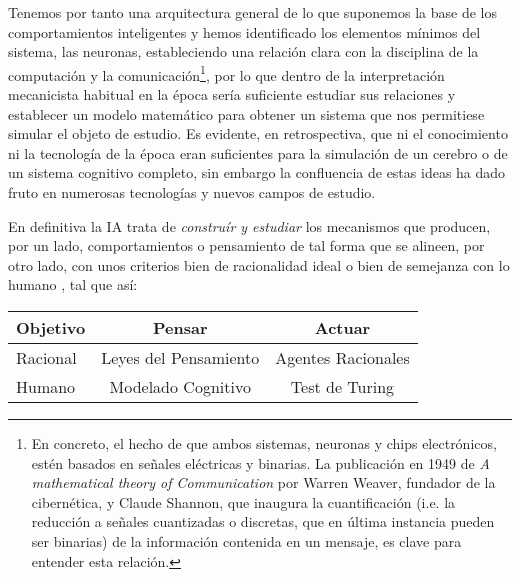 \documentclass[12pt]{memoir}
\begin{document}
Tenemos por tanto una arquitectura general de lo que suponemos la base de los comportamientos inteligentes y hemos identificado los elementos mínimos del sistema, las neuronas, estableciendo una relación clara con la disciplina de la computación y la comunicación\footnote{En concreto, el hecho de que ambos sistemas, neuronas y chips electrónicos, estén basados en señales eléctricas y binarias. La publicación en 1949 de \textit{A mathematical theory of Communication} por Warren Weaver, fundador de la cibernética, y Claude Shannon, que inaugura la cuantificación (i.e. la reducción a señales cuantizadas o discretas, que en última instancia pueden ser binarias) de la información contenida en un mensaje, es clave para entender esta relación.}, por lo que dentro de la interpretación mecanicista habitual en la época sería suficiente estudiar sus relaciones y establecer un modelo matemático para obtener un sistema que nos permitiese simular el objeto de estudio. Es evidente, en retrospectiva, que ni el conocimiento ni la tecnología de la época eran suficientes para la simulación de un cerebro o de un sistema cognitivo completo, sin embargo la confluencia de estas ideas ha dado fruto en numerosas tecnologías y nuevos campos de estudio.

En definitiva la IA trata de \textit{construír y estudiar} los mecanismos que producen, por un lado, comportamientos o pensamiento de tal forma que se alineen, por otro lado, con unos criterios bien de racionalidad ideal o bien de semejanza con lo humano \parencite[p.5]{modernAI}, tal que así:
\begin{center}
\begin{tabular}{l || c | c}
  Objetivo & Pensar & Actuar \\
 \hline
 \hline
 Racional & Leyes del Pensamiento & Agentes Racionales \\
 \hline
 Humano & Modelado Cognitivo & Test de Turing \\
 \hline
\end{tabular}
\end{center}
\end{document}

